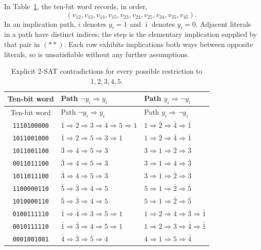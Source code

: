 \documentclass[11pt,a4paper]{article}
\theoremstyle{remark}
\begin{document}
In Table~\ref{tab:n4paths}, the ten-bit word records, in order,
\[
 (v_{12},v_{13},v_{14},v_{15},v_{23},v_{24},v_{25},v_{34},v_{35},v_{45}).
\]
In an implication path, $i$ denotes $y_i=1$ and $\bar\imath$
denotes $y_i=0$.  Adjacent literals in a path have distinct indices;
the step is the elementary implication supplied by that pair in $(**)$.
Each row exhibits implications both ways between opposite literals,
so is unsatisfiable without any further assumptions.

{\small
\begin{longtable}{@{}cll@{}}
\caption{Explicit $2$-SAT contradictions for every possible restriction to $1,2,3,4,5$.\label{tab:n4paths}}\\
\toprule
Ten-bit word&Path $\neg y_i\Rightarrow y_i$&Path $y_i\Rightarrow\neg y_i$\\\midrule
\endfirsthead
\toprule Ten-bit word&Path $\neg y_i\Rightarrow y_i$&Path $y_i\Rightarrow\neg y_i$\\\midrule
\endhead
\texttt{1110100000}&$\bar{1}\Rightarrow2\Rightarrow3\Rightarrow4\Rightarrow5\Rightarrow1$&$1\Rightarrow\bar{2}\Rightarrow\bar{4}\Rightarrow\bar{1}$\\
\texttt{1011001000}&$\bar{1}\Rightarrow2\Rightarrow5\Rightarrow3\Rightarrow1$&$1\Rightarrow\bar{2}\Rightarrow\bar{4}\Rightarrow\bar{1}$\\
\texttt{1011001100}&$\bar{3}\Rightarrow4\Rightarrow5\Rightarrow3$&$3\Rightarrow1\Rightarrow\bar{2}\Rightarrow\bar{3}$\\
\texttt{0011011100}&$\bar{3}\Rightarrow4\Rightarrow5\Rightarrow3$&$3\Rightarrow1\Rightarrow4\Rightarrow\bar{3}$\\
\texttt{1011011100}&$\bar{3}\Rightarrow4\Rightarrow5\Rightarrow3$&$3\Rightarrow1\Rightarrow\bar{2}\Rightarrow\bar{3}$\\
\texttt{1100000110}&$\bar{5}\Rightarrow\bar{3}\Rightarrow4\Rightarrow5$&$5\Rightarrow1\Rightarrow\bar{2}\Rightarrow\bar{5}$\\
\texttt{1010000110}&$\bar{5}\Rightarrow\bar{3}\Rightarrow4\Rightarrow5$&$5\Rightarrow1\Rightarrow\bar{2}\Rightarrow\bar{5}$\\
\texttt{0100111110}&$\bar{1}\Rightarrow\bar{4}\Rightarrow3\Rightarrow5\Rightarrow1$&$1\Rightarrow2\Rightarrow4\Rightarrow\bar{3}\Rightarrow\bar{1}$\\
\texttt{0010111110}&$\bar{1}\Rightarrow\bar{3}\Rightarrow4\Rightarrow5\Rightarrow1$&$1\Rightarrow2\Rightarrow3\Rightarrow\bar{4}\Rightarrow\bar{1}$\\
\texttt{0001001001}&$\bar{4}\Rightarrow\bar{3}\Rightarrow\bar{5}\Rightarrow4$&$4\Rightarrow1\Rightarrow5\Rightarrow\bar{4}$\\

\end{longtable}}
\end{document}
